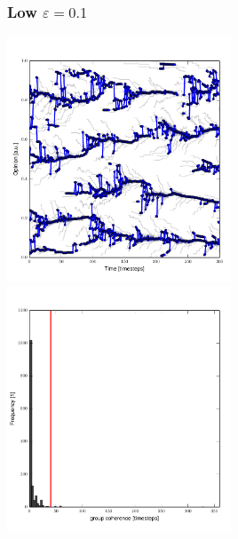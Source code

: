 \documentclass[10pt]{beamer}
\begin{document}
\begin{frame}\frametitle{Low $\varepsilon=0.1$}
    \begin{center}
        \includegraphics[width=0.5\textwidth]{fig/evol_01.pdf}
        \includegraphics[width=0.5\textwidth]{fig/var_01.pdf}
    \end{center}


\end{frame}
\end{document}
